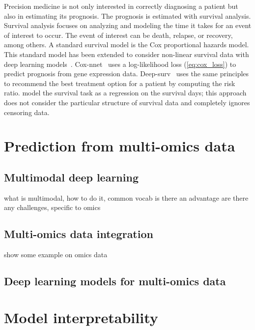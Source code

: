 \documentclass[../main.tex]{subfiles}
\begin{document}
 Precision medicine is not only interested in correctly diagnosing a patient but also in estimating its prognosis.
 The prognosis is estimated with survival analysis.
 Survival analysis focuses on analyzing and modeling the time it takes for an event of interest to occur.
 The event of interest can be death, relapse, or recovery, among others.
 A standard survival model is the Cox proportional hazards model.
 This standard model has been extended to consider non-linear survival data with deep learning models~\cite{katzmanDeepSurvPersonalizedTreatment2018,Ching2018}.
 Cox-nnet~\cite{Ching2018} uses a log-likelihood loss (\cref{eq:cox_loss}) to predict prognosis from gene expression data.
 Deep-surv~\cite{katzmanDeepSurvPersonalizedTreatment2018} uses the same principles to recommend the best treatment option for a patient by computing the risk ratio.
 \citeauthor{Lee2022} model the survival task as a regression on the survival days; this approach does not consider the particular structure of survival data and completely ignores censoring data.

\section{Prediction from multi-omics data}
 \subsection{Multimodal deep learning}
	 what is multimodal, how  to do it, common vocab
	 is there an advantage
	 are there any challenges, specific to omics
 \subsection{Multi-omics data integration}
	 show some example on omics data
 \subsection{Deep learning models for multi-omics data}




\section{Model interpretability}



\end{document}
